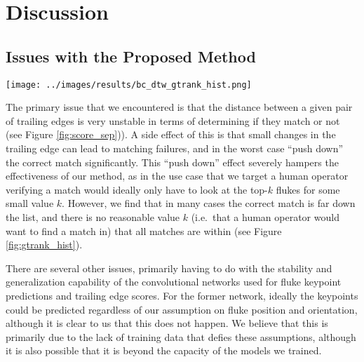 
\chapter{Discussion} \label{sec:discussion}

\section{Issues with the Proposed Method}

\begin{figure*}[t]%
\centering
\texttt{[image: ../images/results/bc\_dtw\_gtrank\_hist.png]}
\caption{\textbf{Histogram of Ground-Truth Ranks}. Note that the histogram ranges are uneven to better show the lower end of the range. In order to have all matches found within the top-$k$ matches we would have to set $k = 414$.}
\label{fig:gtrank_hist}
\end{figure*}

The primary issue that we encountered is that the distance between a given pair of trailing edges is very unstable in terms of determining if they match or not (see Figure \ref{fig:score_sep})).
A side effect of this is that small changes in the trailing edge can lead to matching failures, and in the worst case ``push down'' the correct match significantly.
This ``push down'' effect severely hampers the effectiveness of our method, as in the use case that we target a human operator verifying a match would ideally only have to look at the top-$k$ flukes for some small value $k$.
However, we find that in many cases the correct match is far down the list, and there is no reasonable value $k$ (i.e.\ that a human operator would want to find a match in) that all matches are within (see Figure \ref{fig:gtrank_hist}). 

There are several other issues, primarily having to do with the stability and generalization capability of the convolutional networks used for fluke keypoint predictions and trailing edge scores.
For the former network, ideally the keypoints could be predicted regardless of our assumption on fluke position and orientation, although it is clear to us that this does not happen.
We believe that this is primarily due to the lack of training data that defies these assumptions, although it is also possible that it is beyond the capacity of the models we trained.

